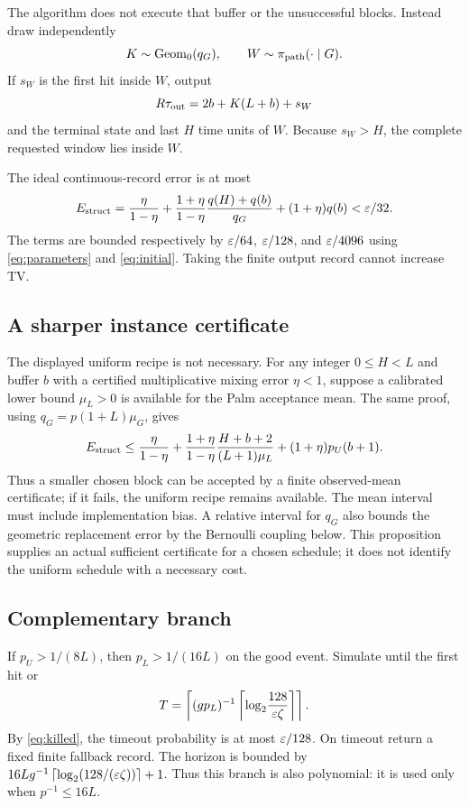 The algorithm does not execute that buffer or the unsuccessful blocks. Instead draw independently
\[
K\sim\operatorname{Geom}_0(q_G),\qquad
W\sim\pi_{\rm path}(\cdot\mid G).
\]
If $s_W$ is the first hit inside $W$, output
\begin{equation}
R\tau_{\rm out}=2b+K(L+b)+s_W \label{eq:clock}
\end{equation}
and the terminal state and last $H$ time units of $W$. Because $s_W>H$, the complete requested window lies inside $W$.

The ideal continuous-record error is at most
\begin{equation}
E_{\rm struct}=
\frac{\eta}{1-\eta}
+\frac{1+\eta}{1-\eta}\frac{q(H)+q(b)}{q_G}
+(1+\eta)q(b)<\varepsilon/32. \label{eq:struct}
\end{equation}
The terms are bounded respectively by $\varepsilon/64$, $\varepsilon/128$, and $\varepsilon/4096$ using \eqref{eq:parameters} and \eqref{eq:initial}. Taking the finite output record cannot increase TV.

\subsection{A sharper instance certificate}
The displayed uniform recipe is not necessary. For any integer $0\le H<L$ and buffer $b$ with a certified multiplicative mixing error $\eta<1$, suppose a calibrated lower bound $\mu_L>0$ is available for the Palm acceptance mean. The same proof, using $q_G=p(1+L)\mu_G$, gives
\begin{equation}
E_{\rm struct}\le
\frac{\eta}{1-\eta}
+\frac{1+\eta}{1-\eta}\frac{H+b+2}{(L+1)\mu_L}
+(1+\eta)p_U(b+1). \label{eq:instance}
\end{equation}
Thus a smaller chosen block can be accepted by a finite observed-mean certificate; if it fails, the uniform recipe remains available. The mean interval must include implementation bias. A relative interval for $q_G$ also bounds the geometric replacement error by the Bernoulli coupling below. This proposition supplies an actual sufficient certificate for a chosen schedule; it does not identify the uniform schedule with a necessary cost.

\subsection{Complementary branch}
If $p_U>1/(8L)$, then $p_L>1/(16L)$ on the good event. Simulate until the first hit or
\begin{equation}
T=\left\lceil(gp_L)^{-1}\left\lceil\log_2\!\frac{128}{\varepsilon\zeta}\right\rceil\right\rceil. \label{eq:T}
\end{equation}
By \eqref{eq:killed}, the timeout probability is at most $\varepsilon/128$. On timeout return a fixed finite fallback record. The horizon is bounded by
$16Lg^{-1}\left\lceil\log_2(128/(\varepsilon\zeta))\right\rceil+1$.
Thus this branch is also polynomial: it is used only when $p^{-1}\le16L$.
